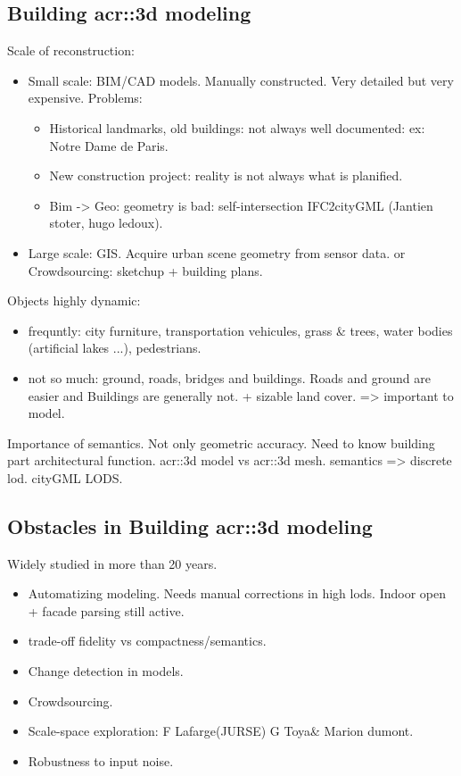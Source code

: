     \subsection{Building \gls{acr::3d} modeling}
        \label{subsec::introduction::urban_3d_reconstruction::building_3d_modeling}
        Scale of reconstruction:
        \begin{itemize}
            \item Small scale: BIM/CAD models. Manually constructed. Very detailed but very expensive. Problems:
            \begin{itemize}
                \item Historical landmarks, old buildings: not always well documented: ex: Notre Dame de Paris.
                \item New construction project: reality is not always what is planified.
                \item Bim -> Geo: geometry is bad: self-intersection IFC2cityGML (Jantien stoter, hugo ledoux).
            \end{itemize}
            \item Large scale: GIS. Acquire urban scene geometry from sensor data. or Crowdsourcing: sketchup + building plans.
        \end{itemize}
        Objects highly dynamic:
        \begin{itemize}
            \item frequntly: city furniture, transportation vehicules, grass \& trees, water bodies (artificial lakes ...), pedestrians.
            \item not so much: ground, roads, bridges and buildings. Roads and ground are easier and Buildings are generally not. + sizable land cover. => important to model.\\
        \end{itemize}
        Importance of semantics. Not only geometric accuracy. Need to know building part architectural function. \gls{acr::3d} model vs \gls{acr::3d} mesh.
        semantics => discrete lod. cityGML LODS.\\
    \subsection{Obstacles in Building \gls{acr::3d} modeling}
        \label{subsec::introduction::urban_3d_reconstruction::challenges}
        Widely studied in more than 20 years.\\
        \begin{itemize}
            \item Automatizing modeling. Needs manual corrections in high lods. Indoor open + facade parsing still active.
            \item trade-off fidelity vs compactness/semantics.
            \item Change detection in models.
            \item Crowdsourcing.
            \item Scale-space exploration: F Lafarge(JURSE) G Toya\& Marion dumont.
            \item Robustness to input noise.
        \end{itemize}
